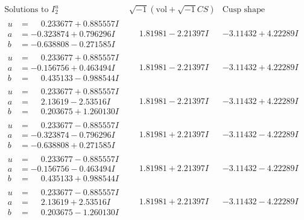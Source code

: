 \documentclass[1p]{elsarticle_modified}
\theoremstyle{definition}
\newcommand{\I}{\sqrt{-1}}
\begin{document}
$$\begin{array}{c|c|c}  
\text{Solutions to }I^u_{2}& \I (\text{vol} + \sqrt{-1}CS) & \text{Cusp shape}\\
 \hline 
\begin{aligned}
u &= \phantom{-}0.233677 + 0.885557 I \\
a &= -0.323874 + 0.796296 I \\
b &= -0.638808 - 0.271585 I\end{aligned}
 & \phantom{-}1.81981 - 2.21397 I & -3.11432 + 4.22289 I \\ \hline\begin{aligned}
u &= \phantom{-}0.233677 + 0.885557 I \\
a &= -0.156756 + 0.463494 I \\
b &= \phantom{-}0.435133 - 0.988544 I\end{aligned}
 & \phantom{-}1.81981 - 2.21397 I & -3.11432 + 4.22289 I \\ \hline\begin{aligned}
u &= \phantom{-}0.233677 + 0.885557 I \\
a &= \phantom{-}2.13619 - 2.53516 I \\
b &= \phantom{-}0.203675 + 1.260130 I\end{aligned}
 & \phantom{-}1.81981 - 2.21397 I & -3.11432 + 4.22289 I \\ \hline\begin{aligned}
u &= \phantom{-}0.233677 - 0.885557 I \\
a &= -0.323874 - 0.796296 I \\
b &= -0.638808 + 0.271585 I\end{aligned}
 & \phantom{-}1.81981 + 2.21397 I & -3.11432 - 4.22289 I \\ \hline\begin{aligned}
u &= \phantom{-}0.233677 - 0.885557 I \\
a &= -0.156756 - 0.463494 I \\
b &= \phantom{-}0.435133 + 0.988544 I\end{aligned}
 & \phantom{-}1.81981 + 2.21397 I & -3.11432 - 4.22289 I \\ \hline\begin{aligned}
u &= \phantom{-}0.233677 - 0.885557 I \\
a &= \phantom{-}2.13619 + 2.53516 I \\
b &= \phantom{-}0.203675 - 1.260130 I\end{aligned}
 & \phantom{-}1.81981 + 2.21397 I & -3.11432 - 4.22289 I \\ \hline\begin{aligned}

\end{aligned}
\end{array}$$
\end{document}
